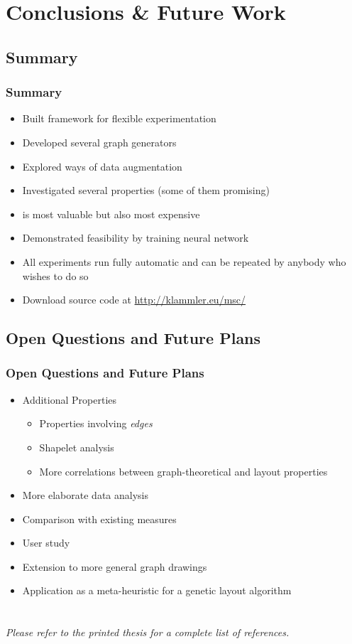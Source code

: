 \documentclass{beamer}
\begin{document}
\section{Conclusions {\&} Future Work}
\subsection{Summary}
\begin{frame}
  \frametitle{Summary}
  \begin{itemize}
  \item Built framework for flexible experimentation
  \item Developed several graph generators
  \item Explored ways of data augmentation
  \item Investigated several properties (some of them promising)
  \item {} is most valuable but also most expensive
  \item Demonstrated feasibility by training neural network
  \item All experiments run fully automatic and can be repeated by anybody who wishes to do so
  \item Download source code at \url{http://klammler.eu/msc/}
  \end{itemize}
\end{frame}

\subsection{Open Questions and Future Plans}
\begin{frame}
  \frametitle{Open Questions and Future Plans}
  \begin{itemize}
  \item Additional Properties
    \begin{itemize}
    \item Properties involving \emph{edges}
    \item Shapelet analysis
    \item More correlations between graph-theoretical and layout properties
    \end{itemize}
  \item More elaborate data analysis
  \item Comparison with existing measures
  \item User study
  \item Extension to more general graph drawings
  \item Application as a meta-heuristic for a genetic layout algorithm
  \end{itemize}
\end{frame}

\section{\bibname}
\begin{frame}[allowframebreaks]
  \frametitle{\bibname}
  \printbibliography
  \par\bigskip
  \emph{Please refer to the printed thesis for a complete list of references.}
\end{frame}
\end{document}
